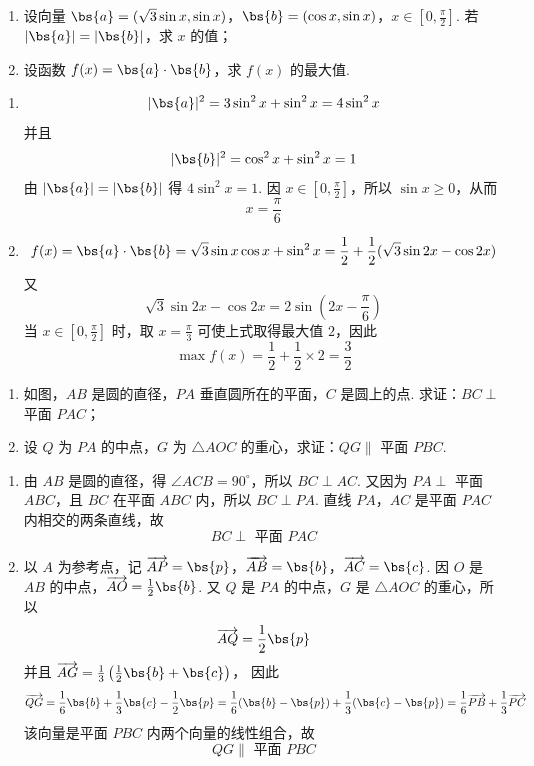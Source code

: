 \begin{problem}
\begin{enumerate}
\item 设向量 \(\bs{a} = (\sqrt{3}\sin x, \sin x)\)，\(\bs{b} = (\cos x, \sin x)\)，\(x \in \left[0, \frac{\pi}{2}\right]\). 若 \(\left|\bs{a}\right| = \left|\bs{b}\right|\)，求 \(x\) 的值；
\item 设函数 \(f(x) = \bs{a} \cdot \bs{b}\)，求 \(f(x)\) 的最大值.
\end{enumerate}
\end{problem}

\begin{solution}
\begin{enumerate}
\item
\[
|\bs{a}|^2=3\sin^2x+\sin^2x=4\sin^2x
\]
并且
\[
|\bs{b}|^2=\cos^2x+\sin^2x=1
\]
由 \(|\bs{a}|=|\bs{b}|\) 得 \(4\sin^2x=1\). 因
\(x\in[0,\frac\pi2]\)，所以 \(\sin x\geqslant0\)，从而
\[
x=\frac\pi6
\]

\item
\[
f(x)=\bs{a}\cdot\bs{b}=\sqrt3\sin x\cos x+\sin^2x
 =\frac12+\frac12(\sqrt3\sin2x-\cos2x)
\]
又
\[
\sqrt3\sin2x-\cos2x=2\sin\left(2x-\frac\pi6\right)
\]
当 \(x\in[0,\frac\pi2]\) 时，取 \(x=\frac\pi3\) 可使上式取得最大值 \(2\)，因此
\[
\max f(x)=\frac12+\frac12\times2=\frac32
\]
\end{enumerate}
\end{solution}

\begin{problem}
\begin{enumerate}
\item 如图，\(AB\) 是圆的直径，\(PA\) 垂直圆所在的平面，\(C\) 是圆上的点. 求证：\(BC \perp\) 平面 \(PAC\)；
\item 设 \(Q\) 为 \(PA\) 的中点，\(G\) 为 \(\triangle AOC\) 的重心，求证：\(QG\parallel\) 平面 \(PBC\).
\end{enumerate}
\end{problem}

\begin{solution}
\begin{enumerate}
\item 由 \(AB\) 是圆的直径，得 \(\angle ACB=90^\circ\)，所以
\(BC\perp AC\). 又因为 \(PA\perp\) 平面 \(ABC\)，且 \(BC\) 在平面 \(ABC\) 内，所以
\(BC\perp PA\). 直线 \(PA\)，\(AC\) 是平面 \(PAC\) 内相交的两条直线，故
\[
BC\perp\text{ 平面 }PAC
\]

\item 以 \(A\) 为参考点，记
\(\overrightarrow{AP}=\bs{p}\)，\(\overrightarrow{AB}=\bs{b}\)，\(\overrightarrow{AC}=\bs{c}\). 因 \(O\)
是 \(AB\) 的中点，\(\overrightarrow{AO}=\frac12\bs{b}\). 又 \(Q\) 是 \(PA\) 的中点，\(G\) 是
\(\triangle AOC\) 的重心，所以
\[
\overrightarrow{AQ}=\frac12\bs{p}
\]
并且 \(\overrightarrow{AG}=\frac13\left(\frac12\bs{b}+\bs{c}\right)\)，
因此
\[
\overrightarrow{QG}=\frac16\bs{b}+\frac13\bs{c}-\frac12\bs{p}
 =\frac16(\bs{b}-\bs{p})+\frac13(\bs{c}-\bs{p})
 =\frac16\overrightarrow{PB}+\frac13\overrightarrow{PC}
\]
该向量是平面 \(PBC\) 内两个向量的线性组合，故
\[
QG\parallel\text{ 平面 }PBC
\]
\end{enumerate}
\end{solution}

